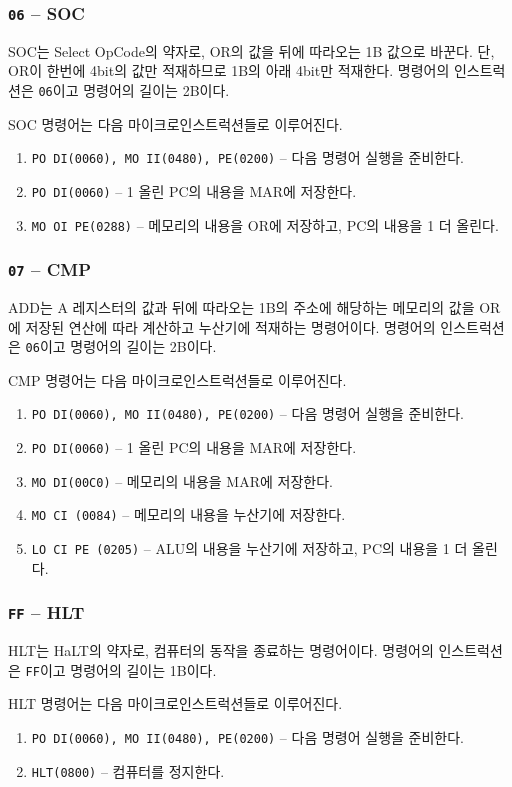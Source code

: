 \documentclass{article}
\begin{document}
\subsubsection{\texttt{06} -- SOC}

SOC는 Select OpCode의 약자로, OR의 값을 뒤에 따라오는 1B 값으로 바꾼다.
단, OR이 한번에 4bit의 값만 적재하므로 1B의 아래 4bit만 적재한다.
명령어의 인스트럭션은 \texttt{06}이고 명령어의 길이는 2B이다.

SOC 명령어는 다음 마이크로인스트럭션들로 이루어진다.

\begin{enumerate}
    \item \texttt{PO DI(0060), MO II(0480), PE(0200)} -- 다음 명령어 실행을 준비한다.
    \item \texttt{PO DI(0060)} -- 1 올린 PC의 내용을 MAR에 저장한다.
    \item \texttt{MO OI PE(0288)} -- 메모리의 내용을 OR에 저장하고,
        PC의 내용을 1 더 올린다.
\end{enumerate}

\subsubsection{\texttt{07} -- CMP}

ADD는 A 레지스터의 값과 뒤에 따라오는 1B의 주소에 해당하는 메모리의 값을
OR에 저장된 연산에 따라 계산하고 누산기에 적재하는 명령어이다.
명령어의 인스트럭션은 \texttt{06}이고 명령어의 길이는 2B이다.

CMP 명령어는 다음 마이크로인스트럭션들로 이루어진다.

\begin{enumerate}
    \item \texttt{PO DI(0060), MO II(0480), PE(0200)} -- 다음 명령어 실행을 준비한다.
    \item \texttt{PO DI(0060)} -- 1 올린 PC의 내용을 MAR에 저장한다.
    \item \texttt{MO DI(00C0)} -- 메모리의 내용을 MAR에 저장한다.
    \item \texttt{MO CI (0084)} -- 메모리의 내용을 누산기에 저장한다.
    \item \texttt{LO CI PE (0205)} -- ALU의 내용을 누산기에 저장하고,
        PC의 내용을 1 더 올린다.
\end{enumerate}

\subsubsection{\texttt{FF} -- HLT}

HLT는 HaLT의 약자로, 컴퓨터의 동작을 종료하는 명령어이다.
명령어의 인스트럭션은 \texttt{FF}이고 명령어의 길이는 1B이다.

HLT 명령어는 다음 마이크로인스트럭션들로 이루어진다.

\begin{enumerate}
    \item \texttt{PO DI(0060), MO II(0480), PE(0200)} -- 다음 명령어 실행을 준비한다.
    \item \texttt{HLT(0800)} -- 컴퓨터를 정지한다.
\end{enumerate}
\end{document}
